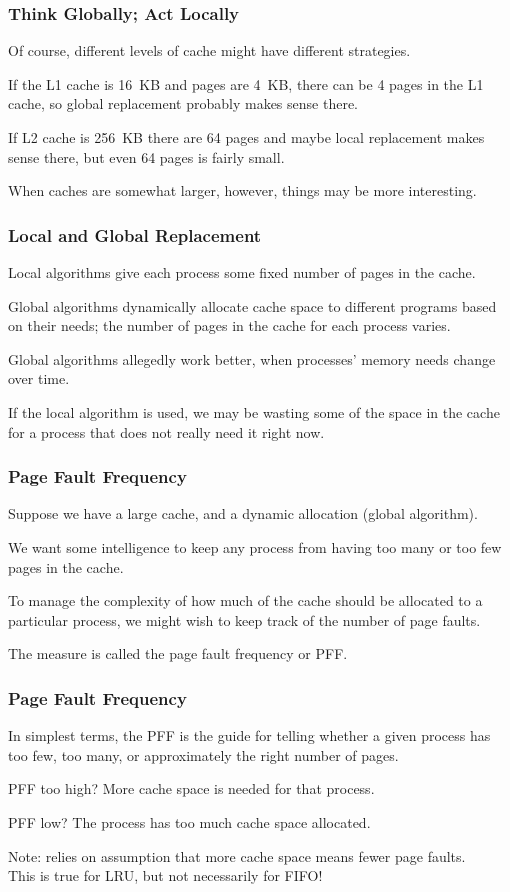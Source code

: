 \begin{frame}
\frametitle{Think Globally; Act Locally}

Of course, different levels of cache might have different strategies. 

If the L1 cache is 16~KB and pages are 4~KB, there can be 4 pages in the L1 cache, so global replacement probably makes sense there. 

If L2 cache is 256~KB there are 64 pages and maybe local replacement makes sense there, but even 64 pages is fairly small.

When caches are somewhat larger, however, things may be more interesting.

\end{frame}


\begin{frame}
\frametitle{Local and Global Replacement}

Local algorithms give each process some fixed number of pages in the cache. 

Global algorithms dynamically allocate cache space to different programs based on their needs; the number of pages in the cache for each process varies.

Global algorithms allegedly work better, when processes' memory needs change over time.

If the local algorithm is used, we may be wasting some of the space in the cache for a process that does not really need it right now. 

\end{frame}

\begin{frame}
\frametitle{Page Fault Frequency}

Suppose we have a large cache, and a dynamic allocation (global algorithm).

We want some intelligence to keep any process from having too many or too few pages in the cache. 

To manage the complexity of how much of the cache should be allocated to a particular process, we might wish to keep track of the number of page faults.

The measure is called the \alert{page fault frequency} or PFF. 


\end{frame}

\begin{frame}
\frametitle{Page Fault Frequency}

In simplest terms, the PFF is the guide for telling whether a given process has too few, too many, or approximately the right number of pages. 

PFF too high? More cache space is needed for that process. 

PFF low? The process has too much cache space allocated.

Note: relies on assumption that more cache space means fewer page faults.\\
\quad This is true for LRU, but not necessarily for FIFO!

\end{frame}



